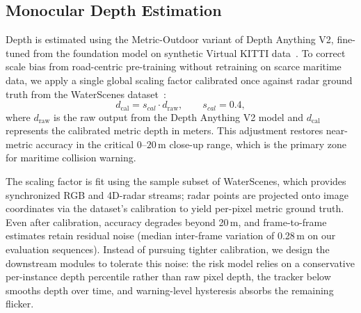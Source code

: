 \subsection{Monocular Depth Estimation}
Depth is estimated using the Metric-Outdoor variant of Depth Anything V2, fine-tuned from the foundation model on synthetic Virtual KITTI data~\cite{gaidon2016virtualworldsproxymultiobject}. To correct scale bias from road-centric pre-training without retraining on scarce maritime data, we apply a single global scaling factor calibrated once against radar ground truth from the WaterScenes dataset~\cite{yao2024waterscenesmultitask4dradarcamera}:
\begin{equation}
  d_\mathrm{cal} = s_{cal} \cdot d_\mathrm{raw}, \qquad s_{cal} = 0.4,
  \label{eq:depth_cal}
\end{equation}
where $d_{\mathrm{raw}}$ is the raw output from the Depth Anything V2 model and $d_{\mathrm{cal}}$ represents the calibrated metric depth in meters. This adjustment restores near-metric accuracy in the critical $0$--$20$\,m close-up range, which is the primary zone for maritime collision warning.

The scaling factor is fit using the sample subset of WaterScenes, which provides synchronized RGB and 4D-radar streams; radar points are projected onto image coordinates via the dataset's calibration to yield per-pixel metric ground truth. Even after calibration, accuracy degrades beyond 20\,m, and frame-to-frame estimates retain residual noise (median inter-frame variation of 0.28\,m on our evaluation sequences). Instead of pursuing tighter calibration, we design the downstream modules to tolerate this noise: the risk model relies on a conservative per-instance depth percentile rather than raw pixel depth, the tracker below smooths depth over time, and warning-level hysteresis absorbs the remaining flicker.

